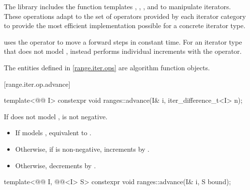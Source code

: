\pnum
The library includes the function templates
, ,
, and 
to manipulate iterators. These operations adapt to the set of operators
provided by each iterator category to provide the most efficient implementation
possible for a concrete iterator type.
\begin{example}
 uses the \tcode{+} operator to move a
 forward  steps in constant time.
For an iterator type that does not model ,
 instead performs  individual increments with
the \tcode{++} operator.
\end{example}

\pnum
The entities defined in \ref{range.iter.ops} are
algorithm function objects.

[range.iter.op.advance]{}

%
\begin{itemdecl}
template<@@ I>
  constexpr void ranges::advance(I& i, iter_difference_t<I> n);
\end{itemdecl}

\begin{itemdescr}
\pnum
\expects
If  does not model ,
 is not negative.

\pnum
\effects
\begin{itemize}
\item If  models ,
  equivalent to .
\item Otherwise, if  is non-negative, increments
   by .
\item Otherwise, decrements  by .
\end{itemize}
\end{itemdescr}

%
\begin{itemdecl}
template<@@ I, @@<I> S>
  constexpr void ranges::advance(I& i, S bound);
\end{itemdecl}


